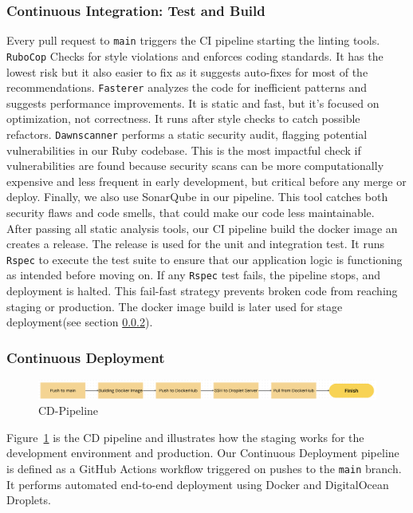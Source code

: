 \subsubsection{Continuous Integration: Test and Build}
Every pull request to \texttt{main} triggers the CI pipeline starting the linting tools. \texttt{RuboCop} Checks for style violations and enforces coding standards. It has the lowest risk but it also easier to fix as it suggests auto-fixes for most of the recommendations. \texttt{Fasterer} analyzes the code for inefficient patterns and suggests performance improvements. It is static and fast, but it’s focused on optimization, not correctness. It runs after style checks to catch possible refactors. \texttt{Dawnscanner} performs a static security audit, flagging potential vulnerabilities in our Ruby codebase. This is the most impactful check if vulnerabilities are found because security scans can be more computationally expensive and less frequent in early development, but critical before any merge or deploy. Finally, we also use SonarQube in our pipeline. This tool catches both security flaws and code smells, that could make our code less maintainable. \\

After passing all static analysis tools, our CI pipeline build the docker image an creates a release. The release is used for the unit and integration test. It runs \texttt{Rspec} to execute the test suite to ensure that our application logic is functioning as intended before moving on. If any \texttt{Rspec} test fails, the pipeline stops, and deployment is halted. This fail-fast strategy prevents broken code from reaching staging or production. 
The docker image build is later used for stage deployment(see section \ref{CD-sec}).

\subsubsection{Continuous Deployment}\label{CD-sec}

\begin{figure}[H]
    \centering
    \includegraphics[width=1\linewidth]
    {images/CD.png}
    \caption{CD-Pipeline}
    \label{fig:CD}
\end{figure}

Figure~\ref{fig:CD} is the CD pipeline and illustrates how the staging works for the development environment and production. Our Continuous Deployment pipeline is defined as a GitHub Actions workflow triggered on pushes to the \texttt{main} branch. It performs automated end-to-end deployment using Docker and DigitalOcean Droplets. \\

